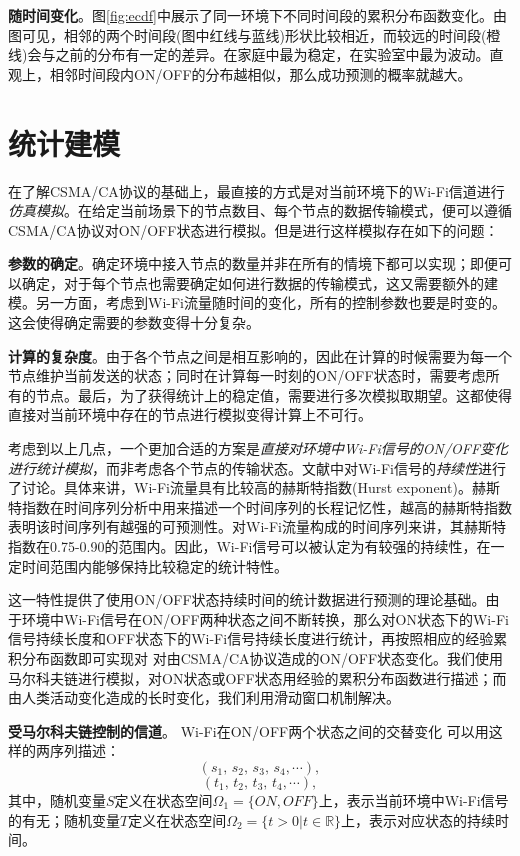 \textbf{随时间变化}。图\ref{fig:ecdf}中展示了同一环境下不同时间段的累积分布函数变化。由图可见，相邻的两个时间段(图中红线与蓝线)形状比较相近，而较远的时间段(橙线)会与之前的分布有一定的差异。在家庭中最为稳定，在实验室中最为波动。直观上，相邻时间段内ON/OFF的分布越相似，那么成功预测的概率就越大。
\section{统计建模}
\label{sec:model}
在了解CSMA/CA协议的基础上，最直接的方式是对当前环境下的Wi-Fi信道进行\emph{仿真模拟}。在给定当前场景下的节点数目、每个节点的数据传输模式，便可以遵循CSMA/CA协议对ON/OFF状态进行模拟。但是进行这样模拟存在如下的问题：

\textbf{参数的确定}。确定环境中接入节点的数量并非在所有的情境下都可以实现；即便可以确定，对于每个节点也需要确定如何进行数据的传输模式，这又需要额外的建模。另一方面，考虑到Wi-Fi流量随时间的变化，所有的控制参数也要是时变的。这会使得确定需要的参数变得十分复杂。

\textbf{计算的复杂度}。由于各个节点之间是相互影响的，因此在计算的时候需要为每一个节点维护当前发送的状态；同时在计算每一时刻的ON/OFF状态时，需要考虑所有的节点。最后，为了获得统计上的稳定值，需要进行多次模拟取期望。这都使得直接对当前环境中存在的节点进行模拟变得计算上不可行。

考虑到以上几点，一个更加合适的方案是\emph{直接对环境中Wi-Fi信号的ON/OFF变化进行统计模拟}，而非考虑各个节点的传输状态。文献\cite{yamkhin2009modeling}中对Wi-Fi信号的\emph{持续性}进行了讨论。具体来讲，Wi-Fi流量具有比较高的赫斯特指数(Hurst exponent)。赫斯特指数在时间序列分析中用来描述一个时间序列的长程记忆性，越高的赫斯特指数表明该时间序列有越强的可预测性。对Wi-Fi流量构成的时间序列来讲，其赫斯特指数在0.75-0.90的范围内。因此，Wi-Fi信号可以被认定为有较强的持续性，在一定时间范围内能够保持比较稳定的统计特性。

这一特性提供了使用ON/OFF状态持续时间的统计数据进行预测的理论基础。由于环境中Wi-Fi信号在ON/OFF两种状态之间不断转换，那么对ON状态下的Wi-Fi信号持续长度和OFF状态下的Wi-Fi信号持续长度进行统计，再按照相应的经验累积分布函数即可实现对
对由CSMA/CA协议造成的ON/OFF状态变化。我们使用马尔科夫链进行模拟，对ON状态或OFF状态用经验的累积分布函数进行描述；而由人类活动变化造成的长时变化，我们利用滑动窗口机制解决。

\textbf{受马尔科夫链控制的信道}。
Wi-Fi在ON/OFF两个状态之间的交替变化
可以用这样的两序列描述：
\begin{equation}
\label{equ:state}
(s_1, \,  s_2, \, s_3 , \, s_4, \cdots),
\end{equation}
\begin{equation}
\label{equ:time}
(t_{1}, \, t_{2}, \, t_{3}, \, t_{4}, \cdots),
\end{equation}
其中，随机变量$S$定义在状态空间$\Omega_1 = \{ON,OFF\}$上，表示当前环境中Wi-Fi信号的有无；随机变量$T$定义在状态空间$\Omega_2 = \{t > 0 | t \in \mathbb{R}\}$上，表示对应状态的持续时间。

